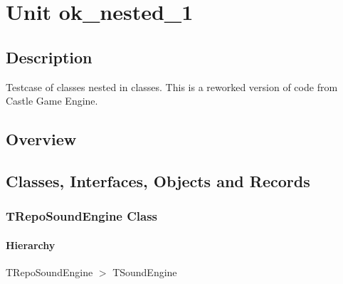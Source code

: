 \documentclass{report}
\newif\ifpdf
\begin{document}
\label{toc}\tableofcontents
\newpage
\newlength{\tmplength}
\chapter{Unit ok{\_}nested{\_}1}
\label{ok_nested_1}
\section{Description}
Testcase of classes nested in classes. This is a reworked version of code from Castle Game Engine.
\section{Overview}
\begin{description}
\item[\texttt{\begin{ttfamily}TRepoSoundEngine\end{ttfamily} Class}]
\end{description}
\section{Classes, Interfaces, Objects and Records}
\ifpdf
\subsection*{\large{\textbf{TRepoSoundEngine Class}}\normalsize\hspace{1ex}\hrulefill}
\else
\subsection*{TRepoSoundEngine Class}
\fi
\label{ok_nested_1.TRepoSoundEngine}
\subsubsection*{\large{\textbf{Hierarchy}}\normalsize\hspace{1ex}\hfill}
TRepoSoundEngine {$>$} TSoundEngine
\end{document}
